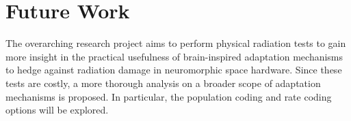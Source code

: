 \vspace{-2em}\section{Future Work}\label{sec:recommendations}
\vspace{-1em}
The overarching research project aims to perform physical radiation tests to gain more insight in the practical usefulness of brain-inspired adaptation mechanisms to hedge against radiation damage in neuromorphic space hardware. Since these tests are costly, a more thorough analysis on a broader scope of adaptation mechanisms is proposed. In particular, the population coding and rate coding options will be explored.%